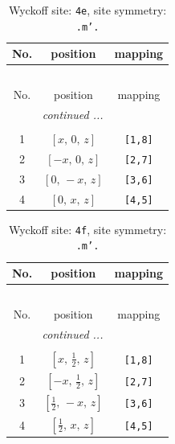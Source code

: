 \documentclass[fleqn,8pt]{jsarticle}
\begin{document}
\begin{longtable}{ccc}
\caption{Wyckoff site: {\tt 4e}, site symmetry: {\tt .m'.}}
 \\
 \hline \hline
No. & position & mapping \\ \hline \endfirsthead

\multicolumn{2}{l}{\tablename\ \thetable{}} \\
 \hline \hline
No. & position & mapping \\ \hline \endhead

 \hline \hline
\multicolumn{2}{r}{\footnotesize\it continued ...} \\ \endfoot

 \hline \hline
\multicolumn{2}{r}{} \\ \endlastfoot

1 & $\left[ x,\, 0,\, z \right]$ & {\tt [1,8]} \\ \hline
2 & $\left[ - x,\, 0,\, z \right]$ & {\tt [2,7]} \\ \hline
3 & $\left[ 0,\, - x,\, z \right]$ & {\tt [3,6]} \\ \hline
4 & $\left[ 0,\, x,\, z \right]$ & {\tt [4,5]} \\
\end{longtable}
\renewcommand{\arraystretch}{1.2}
\begin{longtable}{ccc}
\caption{Wyckoff site: {\tt 4f}, site symmetry: {\tt .m'.}}
 \\
 \hline \hline
No. & position & mapping \\ \hline \endfirsthead

\multicolumn{2}{l}{\tablename\ \thetable{}} \\
 \hline \hline
No. & position & mapping \\ \hline \endhead

 \hline \hline
\multicolumn{2}{r}{\footnotesize\it continued ...} \\ \endfoot

 \hline \hline
\multicolumn{2}{r}{} \\ \endlastfoot

1 & $\left[ x,\, \frac{1}{2},\, z \right]$ & {\tt [1,8]} \\ \hline
2 & $\left[ - x,\, \frac{1}{2},\, z \right]$ & {\tt [2,7]} \\ \hline
3 & $\left[ \frac{1}{2},\, - x,\, z \right]$ & {\tt [3,6]} \\ \hline
4 & $\left[ \frac{1}{2},\, x,\, z \right]$ & {\tt [4,5]} \\
\end{longtable}
\end{document}

